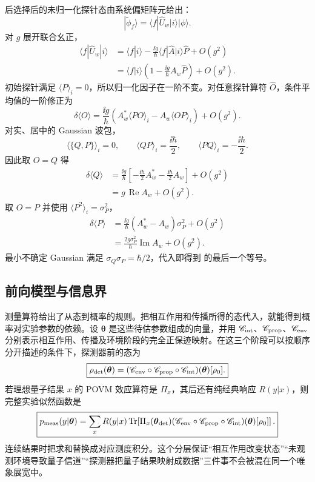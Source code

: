 \begin{exbox}[弱测量与弱值]
后选择后的未归一化探针态由系统偏矩阵元给出：
\[
|\widetilde\phi_f\rangle
=\langle f|\hat U_w|i\rangle|\phi\rangle.
\]
对 $g$ 展开联合幺正，
\begin{align*}
\langle f|\hat U_w|i\rangle
&=\langle f|i\rangle
-\frac{\ii g}{\hbar}\langle f|\hat A|i\rangle\hat P
+O(g^2)\\
&=\langle f|i\rangle
\left(1-\frac{\ii g}{\hbar}A_w\hat P\right)+O(g^2).
\end{align*}
初始探针满足 $\langle P\rangle_i=0$，所以归一化因子在一阶不变。对任意探针算符 $\hat O$，条件平均值的一阶修正为
\[
\delta\langle O\rangle
=\frac{\ii g}{\hbar}
\left(A_w^*\langle P O\rangle_i
-A_w\langle O P\rangle_i\right)+O(g^2).
\]
对实、居中的 Gaussian 波包，
\[
\langle\{Q,P\}\rangle_i=0,
\qquad
\langle QP\rangle_i=\frac{\ii\hbar}{2},
\qquad
\langle PQ\rangle_i=-\frac{\ii\hbar}{2}.
\]
因此取 $O=Q$ 得
\begin{align*}
\delta\langle Q\rangle
&=\frac{\ii g}{\hbar}
\left[-\frac{\ii\hbar}{2}A_w^*
-\frac{\ii\hbar}{2}A_w\right]+O(g^2)\\
&=g\,\operatorname{Re}A_w+O(g^2).
\end{align*}
取 $O=P$ 并使用 $\langle P^2\rangle_i=\sigma_P^2$，
\begin{align*}
\delta\langle P\rangle
&=\frac{\ii g}{\hbar}(A_w^*-A_w)\sigma_P^2+O(g^2)\\
&=\frac{2g\sigma_P^2}{\hbar}\operatorname{Im}A_w+O(g^2).
\end{align*}
最小不确定 Gaussian 满足 $\sigma_Q\sigma_P=\hbar/2$，代入即得到 的最后一个等号。
\end{exbox}

\subsection{前向模型与信息界}

测量算符给出了从态到概率的规则。把相互作用和传播所得的态代入，就能得到概率对实验参数的依赖。设 $\boldsymbol\theta$ 是这些待估参数组成的向量，并用 $\mathscr C_{\rm int}$、$\mathscr C_{\rm prop}$、$\mathscr C_{\rm env}$ 分别表示相互作用、传播及环境阶段的完全正保迹映射。在这三个阶段可以按顺序分开描述的条件下，探测器前的态为
\begin{equation}
\boxed{
\rho_{\rm det}(\boldsymbol\theta)
=(\mathscr C_{\rm env}\circ\mathscr C_{\rm prop}\circ\mathscr C_{\rm int})(\boldsymbol\theta)[\rho_0].}
\label{eq:detector_pre_state_channel_composition}
\end{equation}
若理想量子结果 $x$ 的 POVM 效应算符是 $\Pi_x$，其后还有纯经典响应 $R(y|x)$，则完整实验似然函数是
\begin{equation}
\boxed{
p_{\rm meas}(y|\boldsymbol\theta)
=\sum_xR(y|x)
\operatorname{Tr}\!\left[
\Pi_x(\boldsymbol\theta_{\rm det})
(\mathscr C_{\rm env}\circ\mathscr C_{\rm prop}\circ\mathscr C_{\rm int})(\boldsymbol\theta)[\rho_0]
\right].}
\label{eq:general_experimental_forward_model}
\end{equation}
连续结果时把求和替换成对应测度积分。这个分层保证“相互作用改变状态”“未观测环境导致量子信道”“探测器把量子结果映射成数据”三件事不会被混在同一个唯象展宽中。

